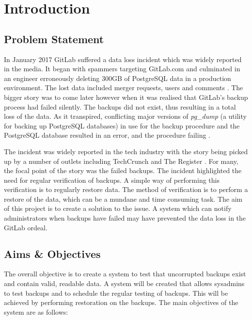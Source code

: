 
\section{Introduction}

\subsection{Problem Statement}
In January 2017 GitLab suffered a data loss incident which was widely reported in the media. It began with spammers targeting GitLab.com and culminated in an engineer erroneously deleting 300GB of PostgreSQL data in a production environment. The lost data included merger requests, users and comments \citep{gitlab1}. The bigger story was to come later however when it was realised that GitLab's backup process had failed silently. The backups did not exist, thus resulting in a total loss of the data. As it transpired, conflicting major versions of \textit{pg\_dump} (a utility for backing up PostgreSQL databases) in use for the backup procedure and the PostgreSQL database resulted in an error, and the procedure failing \citep{gitlab2}.

The incident was widely reported in the tech industry with the story being picked up by a number of outlets including TechCrunch \citeyearpar{lomas} and The Register \citeyearpar{sharwood}. For many, the focal point of the story was the failed backups. The incident highlighted the need for regular verification of backups. A simple way of performing this verification is to regularly restore data. The method of verification is to perform a restore of the data, which can be a mundane and time consuming task. The aim of this project is to create a solution to the issue. A system which can notify administrators when backups have failed may have prevented the data loss in the GitLab ordeal.

\subsection{Aims \& Objectives}
The overall objective is to create a system to test that uncorrupted backups exist and contain valid, readable data. A system will be created that allows sysadmins to test backups and to schedule the regular testing of backups. This will be achieved by performing restoration on the backups. The main objectives of the system are as follows:

